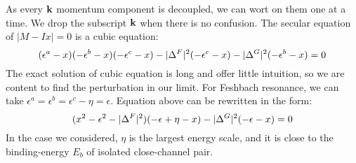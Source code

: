As every $\mathbf{k}$ momentum component is decoupled, we can wort on them one at a time.  We drop the subscript $\mathbf{k}$ when there is no confusion.   The secular equation of $|M-Ix|=0$ is a cubic equation: 
\begin{equation}
(\epsilon^{a}-x)(-\epsilon^{b}-x)(-\epsilon^{c}-x)-\lvert{\Delta^{F}}\rvert^{2}(-\epsilon^{c}-x)-\lvert{\Delta^{G}}\rvert^{2}(-\epsilon^{b}-x)=0
\end{equation}
The exact solution of cubic equation is long and offer little intuition, so we are content to find the perturbation in our limit. For Feshbach resonance, we can take $\epsilon^{a}=\epsilon^{b}=\epsilon^{c}-\eta=\epsilon$.  Equation above can be rewritten in the form:
\begin{equation}
(x^{2}-\epsilon^{2}-\lvert{\Delta^{F}}\rvert^{2})(-\epsilon+\eta-x)-\lvert{\Delta^{G}}\rvert^{2}(-\epsilon-x)=0
\end{equation}
In the case we considered, $\eta$ is the largest energy scale, and it is close to the binding-energy $E_{b}$ of isolated close-channel pair.  


